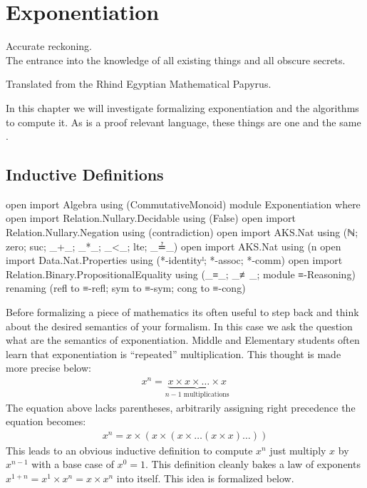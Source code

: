 \documentclass[./Thesis.tex]{subfiles}
\begin{document}
\chapter{Exponentiation}
\label{chap:exponentiation}

\epigraph{
  Accurate reckoning. \\
  The entrance into the knowledge of all existing
  things and all obscure secrets.
}{
  Translated from the Rhind Egyptian Mathematical Papyrus.
  \cite{rhind-papyrus}
}

In this chapter we will investigate formalizing exponentiation and the
algorithms to compute it. As \Agda{} is a proof relevant language, these things
are one and the same \cite{hott-book}.
\section{Inductive Definitions}
\label{sec:inductive-definitions}

\begin{code}[hide]
  open import Algebra using (CommutativeMonoid)
  module Exponentiation where
  open import Relation.Nullary.Decidable using (False)
  open import Relation.Nullary.Negation using (contradiction)
  open import AKS.Nat using (ℕ; zero; suc; _+_; _*_; _<_; lte; _≟_)
  open import AKS.Nat using (n%
  open import Data.Nat.Properties using (*-identityˡ; *-assoc; *-comm)
  open import Relation.Binary.PropositionalEquality using (_≡_; _≢_; module ≡-Reasoning) renaming (refl to ≡-refl; sym to ≡-sym; cong to ≡-cong)
\end{code}

Before formalizing a piece of mathematics its often useful to step
back and think about the desired semantics of your formalism. In this case we
ask the question what are the semantics of exponentiation. Middle and Elementary
students often learn that exponentiation is ``repeated'' multiplication. This
thought is made more precise below:
\begin{align}
  \label{eqn:exp-first-idea}
  x^n = \underbrace{x \times x \times \dots \times x}_{n - 1 \text{ multiplications}}
\end{align}
The equation above lacks parentheses, arbitrarily assigning right precedence
the equation becomes:
\begin{align}
  \label{eqn:exp-second-idea}
  x^n = x \times (x \times (x \times \dots (x \times x) \dots ))
\end{align}
This leads to an obvious inductive definition to compute $x^n$ just multiply $x$
by $x^{n -1}$ with a base case of $x^0 = 1$. This definition cleanly bakes a law
of exponents $x^{1+n} = x^1 \times x^n = x \times x^n$ into itself. This
idea is formalized below. \\
\end{document}
